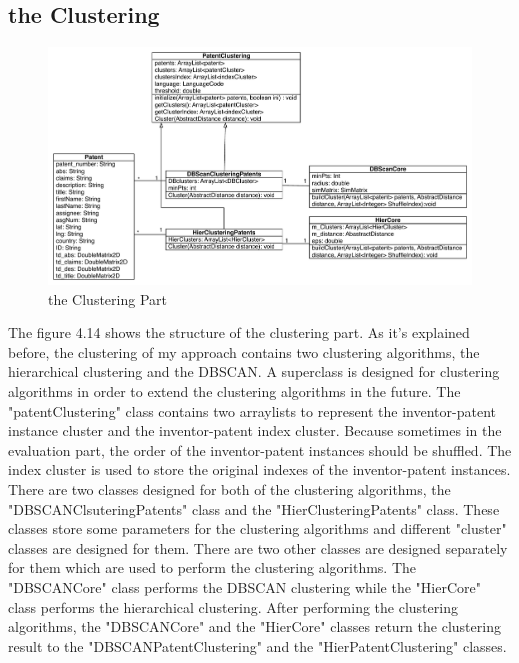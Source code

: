 \subsection{the Clustering}
\begin{figure}
\centering
\includegraphics[width=\headwidth]{clusteringPart.pdf}
\caption{the Clustering Part}
\end{figure}
The figure 4.14 shows the structure of the clustering part. As it's explained before, the clustering of my approach contains two clustering algorithms, the hierarchical clustering and the DBSCAN. A superclass is designed for clustering algorithms in order to extend the clustering algorithms in the future. The "patentClustering" class contains two arraylists to represent the inventor-patent instance cluster and the inventor-patent index cluster. Because sometimes in the evaluation part, the order of the inventor-patent instances should be shuffled. The index cluster is used to store the original indexes of the inventor-patent instances. There are two classes designed for both of the clustering algorithms, the "DBSCANClsuteringPatents" class and the "HierClusteringPatents" class. These classes store some parameters for the clustering algorithms and different "cluster" classes are designed for them. There are two other classes are designed separately for them which are used to perform the clustering algorithms. The "DBSCANCore" class performs the DBSCAN clustering while the "HierCore" class performs the hierarchical clustering. After performing the clustering algorithms, the "DBSCANCore" and the "HierCore" classes return the clustering result  to the "DBSCANPatentClustering" and the "HierPatentClustering" classes.

